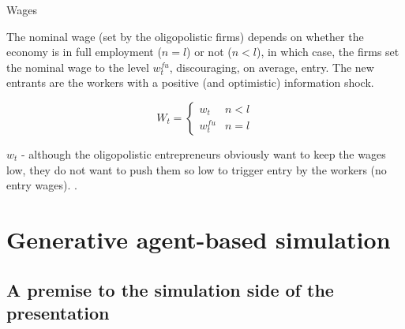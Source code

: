 \documentclass[9pt]{beamer}
\begin{document}
\begin{frame}{Wages}

The nominal wage (set by the oligopolistic firms) depends on whether the economy is in full employment ($n=l$) or not ($n<l$), in which case, the firms set the nominal wage to the level $w_{t}^{fu}$, discouraging, on average, entry. The new entrants are the workers with a positive (and optimistic) information shock.

\begin{equation}
W_{t}=
\begin{cases}
w_{t} & n<l \\
w_{t}^{fu} & n=l
\end{cases}
\label{wage general determination}
\end{equation}

$w_{t}$ -  although the oligopolistic entrepreneurs obviously want to keep the
wages low, they do not want to push them so low to trigger entry by the workers (no entry wages).
.
\end{frame}

\section{Generative agent-based simulation}

\subsection{A premise to the simulation side of the presentation}
\end{document}
